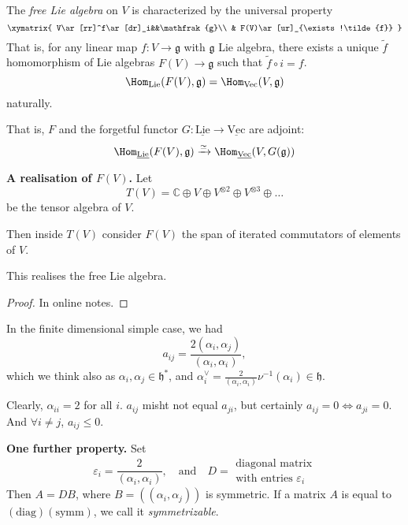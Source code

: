 \begin{definition}
\label{definition-free-Lie-algebra}
The {\it free Lie algebra} on $V$ is characterized by the universal property
$$
\xymatrix{
V\ar[rr]^f\ar[dr]_i&&\mathfrak{g}\\
& F(V)\ar[ur]_{\exists !\tilde{f}}
}
$$
That is, for any linear map $f:V \to \mathfrak{g}$ with $\mathfrak{g}$ Lie
algebra, there exists a unique $\tilde{f}$ homomorphism of Lie algebras 
$F(V)\to \mathfrak{g}$ such that $\tilde{f} \circ i=f$.
$$
\Hom_{\text{Lie}}(F(V),\mathfrak{g})=\Hom_{\text{Vec}}(V,\mathfrak{g})
$$
naturally.
\end{definition}

That is, $F$ and the 
forgetful functor $G:\underline{\text{Lie}}\to \underline{\text{Vec}}$
are adjoint:
$$
\Hom_{\underline{\text{Lie}}}(F(V),\mathfrak{g})
\xrightarrow{\simeq }
\Hom_{\underline{\text{Vec}}}(V,G(\mathfrak{g}))
$$

\medskip\noindent
{\bf A realisation of $F(V)$.} Let 
$$
T(V)=\mathbb{C} \oplus V \oplus V^{\otimes 2}\oplus V^{\otimes 3}\oplus\ldots
$$
be the tensor algebra of $V$. 

Then inside $T(V)$ consider $F(V)$ the span of iterated commutators of elements
of  $V$.

\begin{proposition}
\label{proposition-this-realises-the-free-Lie-algebra}
This realises the free Lie algebra.
\end{proposition}

\begin{proof}
In online notes.
\end{proof}

\medskip\noindent
In the finite dimensional simple case, we had
$$
a_{ij}=\frac{2(\alpha_i,\alpha_j)}{(\alpha_i,\alpha_i)},
$$
which we think also as $\alpha_i,\alpha_j \in \mathfrak{h}^*$, 
and $\alpha_i^\vee=\frac{2}{(\alpha_i,\alpha_i)}\nu^{-1}(\alpha_i) 
\in \mathfrak{h}.$

Clearly, $\alpha_{ii}=2$ for all $i$. 
$a_{ij}$ misht not equal $a_{ji}$, but certainly $a_{ij}=0 \iff a_{ji}=0$. 
And $\forall  i \neq j$, $a_{ij} \leq 0$.

\medskip\noindent
{\bf One further property.} Set
$$
\varepsilon_i=\frac{2}{(\alpha_i,\alpha_i)},\quad \text{and}\quad 
D=\substack{\text{diagonal matrix} \\ \text{with entries }\varepsilon_i}
$$
Then $A=DB$, where $B=((\alpha_i,\alpha_j))$ is symmetric. 
If a matrix $A$ is equal to $(\text{diag})(\text{symm})$, we call it
 {\it symmetrizable}.

